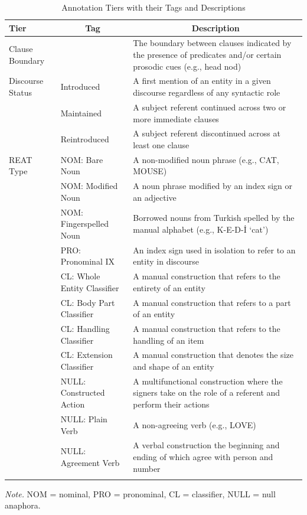 \documentclass[review]{elsarticle} %
\begin{document}
\begin{table}[p]

\begin{center}
\begin{threeparttable}

\caption{\label{tab:tab-2}Annotation Tiers with their Tags and Descriptions}

\footnotesize{

\begin{tabular}{p{3.2cm}p{3.8cm}p{3.8cm}}
\toprule
Tier & \multicolumn{1}{c}{Tag} & \multicolumn{1}{c}{Description}\\
\midrule
Clause Boundary &  & The boundary between clauses indicated by the presence of predicates and/or certain prosodic cues (e.g., head nod)\\
Discourse Status & Introduced & A first mention of an entity in a given discourse regardless of any syntactic role\\
 & Maintained & A subject referent continued across two or more immediate clauses\\
 & Reintroduced & A subject referent discontinued across at least one clause\\
REAT Type & NOM: Bare Noun & A non-modified noun phrase (e.g., CAT, MOUSE)\\
 & NOM: Modified Noun & A noun phrase modified by an index sign or an adjective\\
 & NOM: Fingerspelled Noun & Borrowed nouns from Turkish spelled by the manual alphabet (e.g., K-E-D-İ ‘cat’)\\
 & PRO: Pronominal IX & An index sign used in isolation to refer to an entity in discourse\\
 & CL: Whole Entity Classifier & A manual construction that refers to the entirety of an entity\\
 & CL: Body Part Classifier & A manual construction that refers to a part of an entity\\
 & CL: Handling Classifier & A manual construction that refers to the handling of an item\\
 & CL: Extension Classifier & A manual construction that denotes the size and shape of an entity\\
 & NULL: Constructed Action & A multifunctional construction where the signers take on the role of a referent and perform their actions\\
 & NULL: Plain Verb & A non-agreeing verb (e.g., LOVE)\\
 & NULL: Agreement Verb & A verbal construction the beginning and ending of which agree with person and number\\
\bottomrule
\addlinespace
\end{tabular}

}

\begin{tablenotes}[para]
\normalsize{\textit{Note.} NOM = nominal, PRO = pronominal, CL = classifier, NULL = null anaphora.}
\end{tablenotes}

\end{threeparttable}
\end{center}

\end{table}
\end{document}
